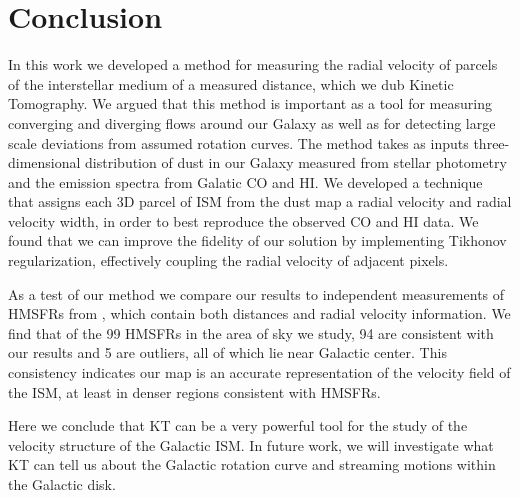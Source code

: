 \section{Conclusion}
\label{sec:conclusion}

In this work we developed a method for measuring the radial velocity of parcels of the interstellar medium of a measured distance, which we dub  Kinetic Tomography. We argued that this method is important as a tool for measuring converging and diverging flows around our Galaxy as well as for detecting large scale deviations from assumed rotation curves. The method takes as inputs three-dimensional distribution of dust in our Galaxy measured from stellar photometry and the emission spectra from Galatic CO and HI. We developed a technique that assigns each 3D parcel of ISM from the dust map a radial velocity and radial velocity width, in order to best reproduce the observed CO and HI data. We found that we can improve the fidelity of our solution by implementing Tikhonov regularization, effectively coupling the radial velocity of adjacent pixels. 

As a test of our method we compare our results to independent measurements of HMSFRs from \Reid{}, which contain both distances and radial velocity information. We find that of the 99 HMSFRs in the area of sky we study, 94 are consistent with our results and 5 are outliers, all of which lie near Galactic center. This consistency indicates our map is an accurate representation of the velocity field of the ISM, at least in denser regions consistent with HMSFRs. 

Here we conclude that KT can be a very powerful tool for the study of the velocity structure of the Galactic ISM. In future work, we will investigate what KT can tell us about the Galactic rotation curve and streaming motions within the Galactic disk. 


